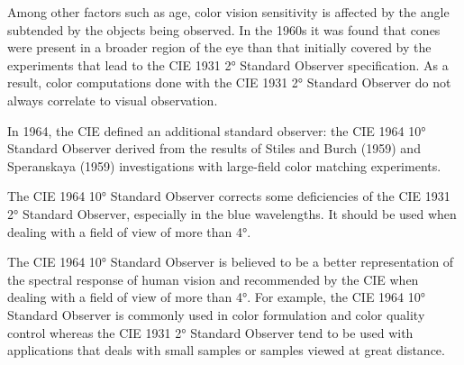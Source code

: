 


Among other factors such as age, color vision sensitivity is affected by the angle subtended by the objects being observed. In the 1960s it was found that cones were present in a broader region of the eye than that initially covered by the experiments that lead to the CIE 1931 2° Standard Observer specification. As a result, color computations done with the CIE 1931 2° Standard Observer do not always correlate to visual observation.

In 1964, the CIE defined an additional standard observer: the CIE 1964 10° Standard Observer derived from the results of Stiles and Burch (1959) and Speranskaya (1959) investigations with large-field color matching experiments.


The CIE 1964 10° Standard Observer corrects some deficiencies of the CIE 1931 2° Standard Observer, especially in the blue wavelengths. It should be used when dealing with a field of view of more than 4°.

The CIE 1964 10° Standard Observer is believed to be a better representation of the spectral response of human vision and recommended by the CIE when dealing with a field of view of more than 4°. For example, the CIE 1964 10° Standard Observer is commonly used in color formulation and color quality control whereas the CIE 1931 2° Standard Observer tend to be used with applications that deals with small samples or samples viewed at great distance.

